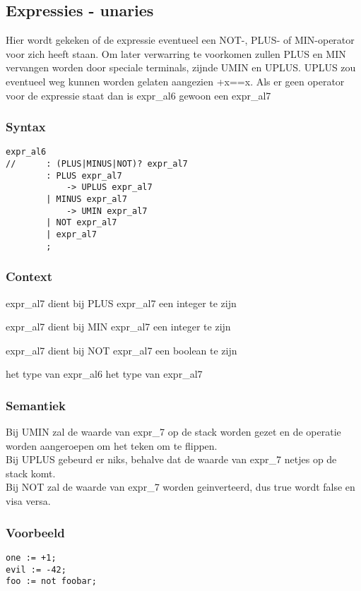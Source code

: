 \documentclass[]{article}
\begin{document}
\subsection{Expressies - unaries}
Hier wordt gekeken of de expressie eventueel een NOT-, PLUS- of MIN-operator voor zich heeft staan.
Om later verwarring te voorkomen zullen PLUS en MIN vervangen worden door speciale terminals, zijnde UMIN en UPLUS. UPLUS zou eventueel weg kunnen worden gelaten aangezien +x==x.
Als er geen operator voor de expressie staat dan is expr\_al6 gewoon een expr\_al7
\subsubsection{Syntax}
\begin{lstlisting}[style=ANTLR]
	expr_al6
//		: (PLUS|MINUS|NOT)? expr_al7
		: PLUS expr_al7
			-> UPLUS expr_al7
		| MINUS expr_al7
			-> UMIN expr_al7
		| NOT expr_al7
		| expr_al7
		;
\end{lstlisting}
\subsubsection{Context}
\begin{list}{•}{•}
\item expr\_al7 dient bij PLUS expr\_al7 een integer te zijn
\item expr\_al7 dient bij MIN expr\_al7 een integer te zijn
\item expr\_al7 dient bij NOT expr\_al7 een boolean te zijn
\item het type van expr\_al6 het type van expr\_al7
\end{list}
\subsubsection{Semantiek}
Bij UMIN zal de waarde van expr\_7 op de stack worden gezet en de operatie worden aangeroepen om het teken om te flippen. \\
Bij UPLUS gebeurd er niks, behalve dat de waarde van expr\_7 netjes op de stack komt.\\
Bij NOT zal de waarde van expr\_7 worden geinverteerd, dus true wordt false en visa versa.
\subsubsection{Voorbeeld}
\begin{lstlisting}[style=SELMA]
one := +1;
evil := -42;
foo := not foobar;
\end{lstlisting}
\end{document}
